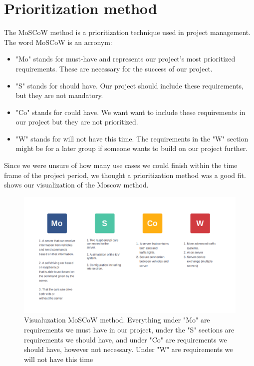 \section{Prioritization method}
The MoSCoW method is a prioritization technique used in project management. The word MoSCoW is an acronym:

\begin{itemize}
	\item "Mo" stands for must-have and represents our project's most prioritized requirements. These are necessary for the success of our project.
	\item "S" stands for should have. Our project should include these requirements, but they are not mandatory.
	\item "Co" stands for could have. We want want to include these requirements in our project but they are not prioritized.
	\item "W" stands for will not have this time. The requirements in the "W" section might be for a later group if someone wants to build on our project further.
\end{itemize}

Since we were unsure of how many use cases we could finish within the time frame of the project period, we thought a prioritization method was a good fit.  shows our visualization of the Moscow method.

\begin{figure}[h!]
	\centering
	\includegraphics[width=1\linewidth]{figures/MosCoW_method}
	\caption[MosCoW method]{Visualuzation MoSCoW method. Everything under "Mo" are requirements we must have in our project, under the "S" sections are requirements we should have, and under "Co" are requirements we should have, however not necessary. Under "W" are requirements we will not have this time}
	\label{fig:moscowmethod}
\end{figure}


